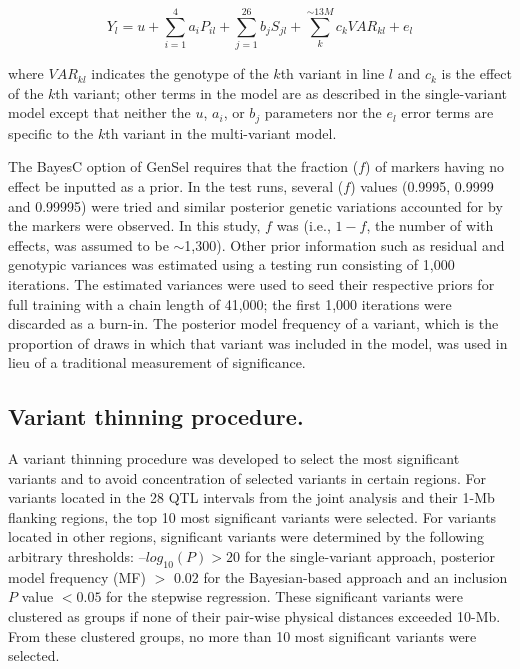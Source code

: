 \documentclass[10pt,letterpaper]{article}
\begin{document}
\begin{equation}\label{eq:schemeP2} 
Y_l = u + \sum_{i=1}^{4}a_{i}P_{il} + \sum_{j=1}^{26} b_{j}S_{jl} + \sum_k^{\sim 13M}c_k VAR_{kl} + e_l
\end{equation}

where $VAR_{kl}$ indicates the genotype of the $k$th variant in line $l$ and $c_k$ is the effect of the $k$th variant; other terms in the model are as described in the single-variant model except that neither the $u$, $a_i$, or $b_j$ parameters nor the $e_l$ error terms are specific to the $k$th variant in the multi-variant model. 

The BayesC option of GenSel requires that the fraction ($f$) of markers having no effect be inputted as a prior. In the test runs, several ($f$) values (0.9995, 0.9999 and 0.99995) were tried and similar posterior genetic variations accounted for by the markers were observed. In this study, $f$ was \DIFdelbegin {}\DIFdelend \DIFaddbegin {} (i.e., $1 - f$, the number of \DIFdelbegin {}\DIFdelend \DIFaddbegin {}\DIFaddend with effects, was assumed to be $\sim$1,300). Other prior information such as residual and genotypic variances was estimated using a testing run consisting of 1,000 iterations. The estimated variances were used to seed their respective priors for full training with a chain length of 41,000; the first 1,000 iterations were discarded as a burn-in. The posterior model frequency of a variant, which is the proportion of draws in which that variant was included in the model, was used in lieu of a traditional measurement of significance.

\subsection*{Variant thinning procedure.}
A variant thinning procedure was developed to select the most significant variants and to avoid concentration of selected variants in certain regions. For variants located in the 28 QTL intervals from the joint analysis and their 1-Mb flanking regions, the top 10 most significant variants were selected. For variants located in other regions, significant variants were determined by the following arbitrary thresholds: $–log_{10}(P) > 20$ for the single-variant approach, posterior model frequency (MF) $>$ 0.02 for the Bayesian-based approach and an inclusion $P$ value $< 0.05$ for the stepwise regression. These significant variants were clustered as groups if none of their pair-wise physical distances exceeded 10-Mb. From these clustered groups, no more than 10 most significant variants were selected.        
\end{document}
